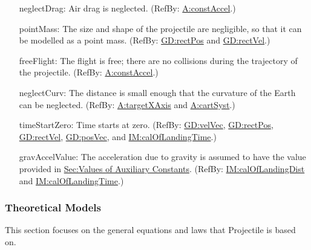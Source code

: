 \documentclass[12pt]{article}
\begin{document}
\begin{itemize}
\item[neglectDrag:\phantomsection\label{neglectDrag}]{Air drag is neglected. (RefBy: \hyperref[constAccel]{A:constAccel}.)}
\item[pointMass:\phantomsection\label{pointMass}]{The size and shape of the projectile are negligible, so that it can be modelled as a point mass. (RefBy: \hyperref[GD:rectPos]{GD:rectPos} and \hyperref[GD:rectVel]{GD:rectVel}.)}
\item[freeFlight:\phantomsection\label{freeFlight}]{The flight is free; there are no collisions during the trajectory of the projectile. (RefBy: \hyperref[constAccel]{A:constAccel}.)}
\item[neglectCurv:\phantomsection\label{neglectCurv}]{The distance is small enough that the curvature of the Earth can be neglected. (RefBy: \hyperref[targetXAxis]{A:targetXAxis} and \hyperref[cartSyst]{A:cartSyst}.)}
\item[timeStartZero:\phantomsection\label{timeStartZero}]{Time starts at zero. (RefBy: \hyperref[GD:velVec]{GD:velVec}, \hyperref[GD:rectPos]{GD:rectPos}, \hyperref[GD:rectVel]{GD:rectVel}, \hyperref[GD:posVec]{GD:posVec}, and \hyperref[IM:calOfLandingTime]{IM:calOfLandingTime}.)}
\item[gravAccelValue:\phantomsection\label{gravAccelValue}]{The acceleration due to gravity is assumed to have the value provided in \hyperref[Sec:AuxConstants]{Sec:Values of Auxiliary Constants}. (RefBy: \hyperref[IM:calOfLandingDist]{IM:calOfLandingDist} and \hyperref[IM:calOfLandingTime]{IM:calOfLandingTime}.)}
\end{itemize}
\subsubsection{Theoretical Models}
\label{Sec:TMs}
This section focuses on the general equations and laws that Projectile is based on.
\end{document}
